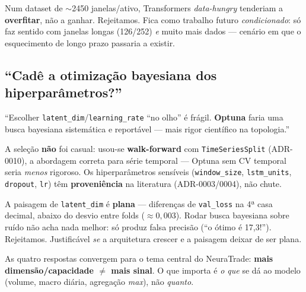 \begin{tradeoff}
Num dataset de ${\sim}$2450 janelas/ativo, Transformers \emph{data-hungry} tenderiam a
\textbf{overfitar}, não a ganhar. Rejeitamos. Fica como trabalho futuro \emph{condicionado}: só faz
sentido com janelas longas (126/252) \emph{e} muito mais dados --- cenário em que o esquecimento de
longo prazo passaria a existir.
\end{tradeoff}

\subsection{``Cadê a otimização bayesiana dos hiperparâmetros?''}
\label{sec:debate-optuna}

\begin{confronto}
``Escolher \texttt{latent\_dim}/\texttt{learning\_rate} ``no olho'' é frágil. \textbf{Optuna} faria
uma busca bayesiana sistemática e reportável --- mais rigor científico na topologia.''
\end{confronto}

A seleção \textbf{não} foi casual: usou-se \textbf{walk-forward} com \texttt{TimeSeriesSplit}
(ADR-0010), a abordagem correta para série temporal --- Optuna sem CV temporal seria \emph{menos}
rigoroso. Os hiperparâmetros sensíveis (\texttt{window\_size}, \texttt{lstm\_units}, \texttt{dropout},
\texttt{lr}) têm \textbf{proveniência} na literatura (ADR-0003/0004), não chute.

\begin{tradeoff}
A paisagem de \texttt{latent\_dim} é \textbf{plana} --- diferenças de \texttt{val\_loss} na 4ª casa
decimal, abaixo do desvio entre folds ($\approx 0{,}003$). Rodar busca bayesiana sobre ruído não acha
nada melhor: só produz falsa precisão (``o ótimo é 17,3!''). Rejeitamos. Justificável \emph{se} a
arquitetura crescer e a paisagem deixar de ser plana.
\end{tradeoff}

\begin{intuicao}
As quatro respostas convergem para o tema central do NeuraTrade: \textbf{mais
dimensão/capacidade $\ne$ mais sinal}. O que importa é \emph{o que} se dá ao modelo (volume, macro
diária, agregação \emph{max}), não \emph{quanto}.
\end{intuicao}
